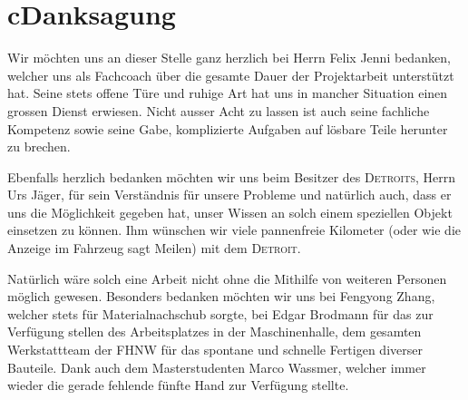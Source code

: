 \chapter*{c\quad Danksagung}
Wir möchten uns an dieser Stelle ganz herzlich bei Herrn Felix Jenni bedanken, welcher uns als Fachcoach über die gesamte Dauer der Projektarbeit unterstützt hat. Seine stets offene Türe und ruhige Art hat uns in mancher Situation einen grossen Dienst erwiesen. Nicht ausser Acht zu lassen ist auch seine fachliche Kompetenz sowie seine Gabe, komplizierte Aufgaben auf lösbare Teile herunter zu brechen.

Ebenfalls herzlich bedanken möchten wir uns beim Besitzer des \textsc{Detroits}, Herrn Urs Jäger, für sein Verständnis für unsere Probleme und natürlich auch, dass er uns die Möglichkeit gegeben hat, unser Wissen an solch einem speziellen Objekt einsetzen zu können. Ihm wünschen wir viele pannenfreie Kilometer (oder wie die Anzeige im Fahrzeug sagt Meilen) mit dem \textsc{Detroit}.

Natürlich wäre solch eine Arbeit nicht ohne die Mithilfe von weiteren Personen möglich gewesen. Besonders bedanken möchten wir uns bei Fengyong Zhang, welcher stets für Materialnachschub sorgte, bei Edgar Brodmann für das zur Verfügung stellen des Arbeitsplatzes in der Maschinenhalle, dem gesamten Werkstattteam der FHNW für das spontane und schnelle Fertigen diverser Bauteile. Dank auch dem Masterstudenten Marco Wassmer, welcher immer wieder die gerade fehlende fünfte Hand zur Verfügung stellte.